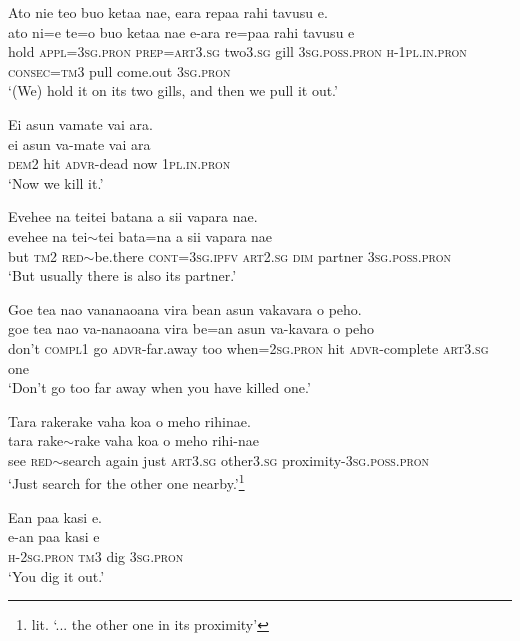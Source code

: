 \ea\label{ex:text28-10}
Ato nie teo buo ketaa nae, eara repaa rahi tavusu e.\\
\gll ato	ni=e	te=o	buo	ketaa	nae	e-ara	re=paa	rahi	tavusu	e\\
     hold	\textsc{appl}=3\textsc{sg}.\textsc{pron}	\textsc{prep}=\textsc{art}3.\textsc{sg}	two3.\textsc{sg}	gill	3\textsc{sg}.\textsc{poss}.\textsc{pron}	\textsc{h}-1\textsc{pl}.\textsc{in}.\textsc{pron}	\textsc{consec}=\textsc{tm}3	pull	come.out	3\textsc{sg}.\textsc{pron}\\
\glt `(We) hold it on its two gills, and then we pull it out.'
\z

\ea\label{ex:text28-11}
Ei asun vamate vai ara.\\
\gll ei	asun	va-mate	vai	ara\\
     \textsc{dem}2	hit	\textsc{advr}-dead	now	1\textsc{pl}.\textsc{in}.\textsc{pron}\\
\glt `Now we kill it.'
\z

\ea\label{ex:text28-12}
Evehee na teitei batana a sii vapara nae.\\
\gll evehee	na	tei{$\sim$}tei	bata=na	a	sii	vapara	nae\\
     but	\textsc{tm}2	\textsc{red}{$\sim$}be.there	\textsc{cont}=3\textsc{sg}.\textsc{ipfv}	\textsc{art}2.\textsc{sg}	\textsc{dim}	partner	3\textsc{sg}.\textsc{poss}.\textsc{pron}\\
\glt `But usually there is also its partner.'
\z

\ea\label{ex:text28-13}
Goe tea nao vananaoana vira bean asun vakavara o peho.\\
\gll goe	tea	nao	va-nanaoana	vira	be=an	asun	va-kavara	o	peho\\
     don't	\textsc{compl}1	go	\textsc{advr}-far.away	too	when=2\textsc{sg}.\textsc{pron}	hit	\textsc{advr}-complete	\textsc{art}3.\textsc{sg}	one\\
\glt `Don't go too far away when you have killed one.'
\z

\ea\label{ex:text28-14}
Tara rakerake vaha koa o meho rihinae.\\
\gll tara	rake{$\sim$}rake	vaha	koa	o	meho	rihi-nae\\
     see	\textsc{red}{$\sim$}search	again	just	\textsc{art}3.\textsc{sg}	other3.\textsc{sg}	proximity-3\textsc{sg}.\textsc{poss}.\textsc{pron}\\
\glt `Just search for the other one nearby.'\footnote{lit. `... the other one in its proximity'}
\z

\ea\label{ex:text28-15}
Ean paa kasi e.\\
\gll e-an	paa	kasi	e\\
     \textsc{h}-2\textsc{sg}.\textsc{pron}	\textsc{tm}3	dig	3\textsc{sg}.\textsc{pron}\\
\glt `You dig it out.'
\z

